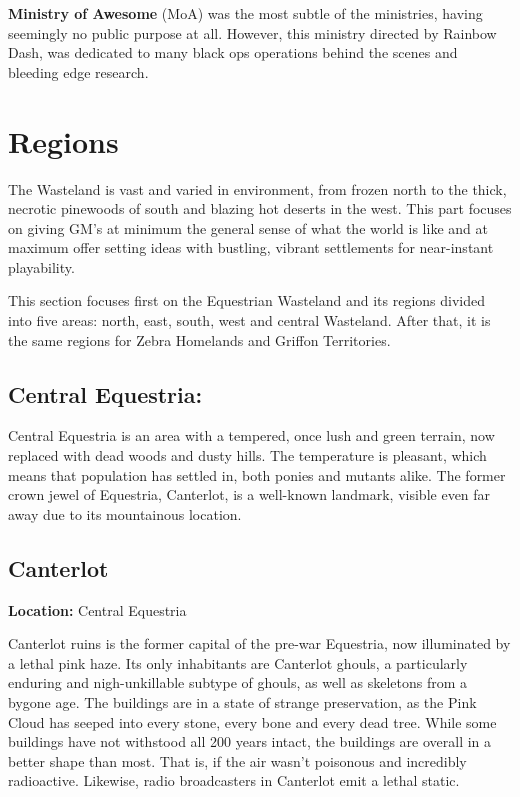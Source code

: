 \documentclass[11pt,a4paper,twocolumn]{book}
\begin{document}
    \bigskip
    
    \textbf{Ministry of Awesome} (MoA) was the most subtle of the ministries, having seemingly no public purpose at all. However, this ministry directed by Rainbow Dash, was dedicated to many black ops operations behind the scenes and bleeding edge research.
    
    
    \section*{Regions}
    
    The Wasteland is vast and varied in environment, from frozen north to the thick, necrotic pinewoods of south and blazing hot deserts in the west. This part focuses on giving GM's at minimum the general sense of what the world is like and at maximum offer setting ideas with bustling, vibrant settlements for near-instant playability.
    
    This section focuses first on the Equestrian Wasteland and its regions divided into five areas: north, east, south, west and central Wasteland. After that, it is the same regions for Zebra Homelands and Griffon Territories.

    \bigskip
    
    \subsection*{Central Equestria:}
    
    Central Equestria is an area with a tempered, once lush and green terrain, now replaced with dead woods and dusty hills. The temperature is pleasant, which means that population has settled in, both ponies and mutants alike. The former crown jewel of Equestria, Canterlot, is a well-known landmark, visible even far away due to its mountainous location.
    
    \subsection*{Canterlot}
    \textbf{Location:} Central Equestria
    
    Canterlot ruins is the former capital of the pre-war Equestria, now illuminated by a lethal pink haze. Its only inhabitants are Canterlot ghouls, a particularly enduring and nigh-unkillable subtype of ghouls, as well as skeletons from a bygone age. The buildings are in a state of strange preservation, as the Pink Cloud has seeped into every stone, every bone and every dead tree. While some buildings have not withstood all 200 years intact, the buildings are overall in a better shape than most. That is, if the air wasn't poisonous and incredibly radioactive. Likewise, radio broadcasters in Canterlot emit a lethal static.
    
\end{document}
